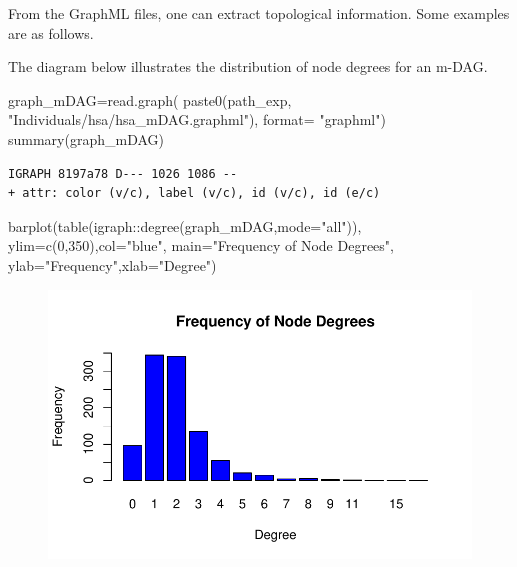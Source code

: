 \documentclass[
  letterpaper,
  DIV=11,
  numbers=noendperiod]{scrreprt}
\newenvironment{Shaded}{}{}
\newcommand{\AttributeTok}[1]{\textcolor[rgb]{0.78,0.47,0.87}{#1}}
\newcommand{\DecValTok}[1]{\textcolor[rgb]{0.82,0.60,0.40}{#1}}
\newcommand{\FunctionTok}[1]{\textcolor[rgb]{0.38,0.69,0.94}{#1}}
\newcommand{\NormalTok}[1]{\textcolor[rgb]{0.67,0.70,0.75}{#1}}
\newcommand{\OtherTok}[1]{\textcolor[rgb]{0.15,0.68,0.38}{#1}}
\newcommand{\SpecialCharTok}[1]{\textcolor[rgb]{0.34,0.71,0.76}{#1}}
\newcommand{\StringTok}[1]{\textcolor[rgb]{0.60,0.76,0.47}{#1}}
\begin{document}
From the GraphML files, one can extract topological information. Some
examples are as follows.

The diagram below illustrates the distribution of node degrees for an
m-DAG.

\begin{Shaded}
\begin{Highlighting}[]
\NormalTok{graph\_mDAG}\OtherTok{=}\FunctionTok{read.graph}\NormalTok{(}
  \FunctionTok{paste0}\NormalTok{(path\_exp,}
         \StringTok{"Individuals/hsa/hsa\_mDAG.graphml"}\NormalTok{),}
  \AttributeTok{format=} \StringTok{"graphml"}\NormalTok{)}
\FunctionTok{summary}\NormalTok{(graph\_mDAG)}
\end{Highlighting}
\end{Shaded}

\begin{verbatim}
IGRAPH 8197a78 D--- 1026 1086 -- 
+ attr: color (v/c), label (v/c), id (v/c), id (e/c)
\end{verbatim}

\begin{Shaded}
\begin{Highlighting}[]
\FunctionTok{barplot}\NormalTok{(}\FunctionTok{table}\NormalTok{(igraph}\SpecialCharTok{::}\FunctionTok{degree}\NormalTok{(graph\_mDAG,}\AttributeTok{mode=}\StringTok{"all"}\NormalTok{)),}
        \AttributeTok{ylim=}\FunctionTok{c}\NormalTok{(}\DecValTok{0}\NormalTok{,}\DecValTok{350}\NormalTok{),}\AttributeTok{col=}\StringTok{"blue"}\NormalTok{,}
        \AttributeTok{main=}\StringTok{"Frequency of Node Degrees"}\NormalTok{,}
        \AttributeTok{ylab=}\StringTok{"Frequency"}\NormalTok{,}\AttributeTok{xlab=}\StringTok{"Degree"}\NormalTok{)}
\end{Highlighting}
\end{Shaded}

\begin{figure}[H]

{\centering \includegraphics[width=1\textwidth,height=\textheight]{metabolic_graphs_files/figure-pdf/unnamed-chunk-10-1.pdf}

}

\end{figure}
\end{document}
